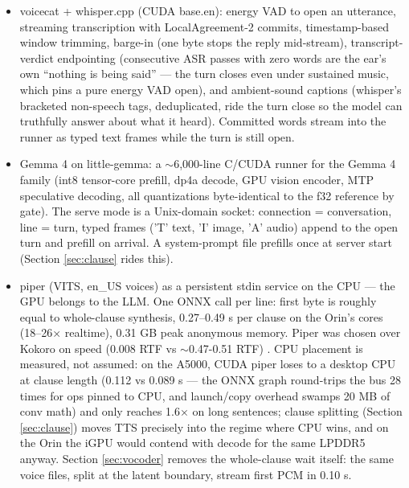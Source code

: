 \documentclass{article}
\begin{document}
\begin{itemize}
	\item voicecat + whisper.cpp (CUDA base.en): energy VAD to open an utterance, streaming transcription with LocalAgreement-2 commits, timestamp-based window trimming, barge-in (one byte stops the reply mid-stream), transcript-verdict endpointing (consecutive ASR passes with zero words are the ear's own ``nothing is being said'' --- the turn closes even under sustained music, which pins a pure energy VAD open), and ambient-sound captions (whisper's bracketed non-speech tags, deduplicated, ride the turn close so the model can truthfully answer about what it heard). Committed words stream into the runner as typed text frames while the turn is still open.
	\item Gemma 4 on little-gemma: a $\sim$6,000-line C/CUDA runner for the Gemma 4 family (int8 tensor-core prefill, dp4a decode, GPU vision encoder, MTP speculative decoding, all quantizations byte-identical to the f32 reference by gate). The serve mode is a Unix-domain socket: connection = conversation, line = turn, typed frames ('T' text, 'I' image, 'A' audio) append to the open turn and prefill on arrival. A system-prompt file prefills once at server start (Section \ref{sec:clause} rides this).
	\item piper (VITS, en\_US voices) as a persistent stdin service on the CPU --- the GPU belongs to the LLM. One ONNX call per line: first byte is roughly equal to whole-clause synthesis, 0.27--0.49 s per clause on the Orin's cores (18--26× realtime), 0.31 GB peak anonymous memory. Piper was chosen over Kokoro on speed (0.008 RTF vs $\sim$0.47-0.51 RTF) \citep{codesotatts}. CPU placement is measured, not assumed: on the A5000, CUDA piper loses to a desktop CPU at clause length (0.112 vs 0.089 s --- the ONNX graph round-trips the bus 28 times for ops pinned to CPU, and launch/copy overhead swamps 20 MB of conv math) and only reaches 1.6× on long sentences; clause splitting (Section \ref{sec:clause}) moves TTS precisely into the regime where CPU wins, and on the Orin the iGPU would contend with decode for the same LPDDR5 anyway. Section \ref{sec:vocoder} removes the whole-clause wait itself: the same voice files, split at the latent boundary, stream first PCM in 0.10 s.
\end{itemize}
\end{document}
